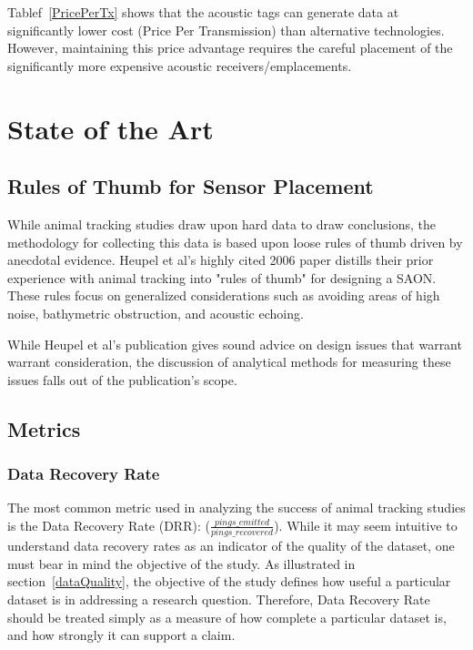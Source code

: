 Tablef~\ref{PricePerTx} shows that the acoustic tags can generate data at significantly lower cost (Price Per Transmission) than alternative technologies.  However, maintaining this price advantage requires the careful placement of the significantly more expensive acoustic receivers/emplacements.  






\section{State of the Art}

\subsection{Rules of Thumb for Sensor Placement}
\label{RulesOfThumb}
While animal tracking studies draw upon hard data to draw conclusions, the methodology for collecting this data is based upon loose rules of thumb driven by anecdotal evidence.  Heupel et al's highly cited 2006 paper distills their prior experience with animal tracking into "rules of thumb" for designing a SAON.  These rules focus on generalized considerations such as avoiding areas of high noise, bathymetric obstruction, and acoustic echoing\cite{Heupel2006}.  

While Heupel et al's publication gives sound advice on design issues that warrant warrant consideration, the discussion of analytical methods for measuring these issues falls out of the publication's scope.


\subsection{Metrics}
\subsubsection{Data Recovery Rate}
\label{dataRecoveryRate}
The most common metric used in analyzing the success of animal tracking studies is the Data Recovery Rate (DRR): ($\frac{pings\_emitted}{pings\_recovered}$).  While it may seem intuitive to understand data recovery rates as an indicator of the quality of the dataset, one must bear in mind the objective of the study.  As illustrated in section~\ref{dataQuality}, the objective of the study defines how useful a particular dataset is in addressing a research question.  Therefore, Data Recovery Rate should be treated simply as a measure of how complete a particular dataset is, and how strongly it can support a claim.  

